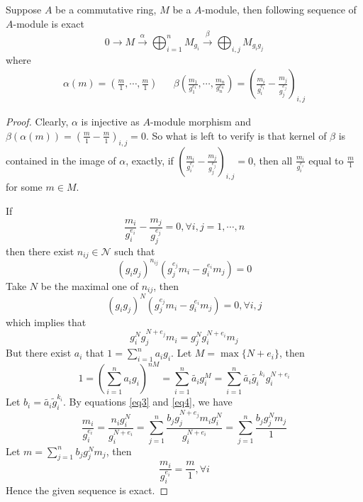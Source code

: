 \begin{lemma}
\label{lem1}
Suppose $A$ be a commutative ring, $M$ be a $A$-module, then following sequence of $A$-module is exact
\[
0 \rightarrow M \xrightarrow{\alpha} \bigoplus_{i=1}^{n} M_{g_i} \xrightarrow{\beta} \bigoplus_{i,j}M_{g_{i}g_{j}}
\]
where
\begin{align*}
\alpha(m)=(\frac{m}{1},\cdots, \frac{m}{1})& & \beta(\frac{m_1}{g_{1}^{e_1}},\cdots, \frac{m_n}{g_{n}^{e_n}})=(\frac{m_i}{g_{i}^{e_i}}-\frac{m_j}{g_{j}^{e_j}})_{i,j}
\end{align*}
\end{lemma}
\begin{proof}
Clearly, $\alpha$ is injective as $A$-module morphism and $\beta(\alpha(m))=(\frac{m}{1}-\frac{m}{1})_{i,j}=0$. So what is left to verify is that kernel of $\beta$ is contained in the image of $\alpha$, exactly, if $(\frac{m_i}{g_{i}^{e_i}}-\frac{m_j}{g_{j}^{e_j}})_{i,j}=0$, then all $\frac{m_i}{g_{i}^{e_i}}$ equal to $\frac{m}{1}$ for some $m \in M$.
\par
If
\[
\frac{m_i}{g_{i}^{e_i}}-\frac{m_j}{g_{j}^{e_j}}=0, \forall i, j =1,\cdots, n
\]
then there exist $n_{ij} \in \mathcal{N}$ such that
\begin{equation}
\label{eq1}
(g_{i}g_{j})^{n_{ij}}(g_{j}^{e_j} m_i - g_{i}^{e_i} m_j) =0
\end{equation}
Take $N$ be the maximal one of $n_{ij}$, then
\begin{equation}
\label{eq2}
(g_{i}g_{j})^{N}(g_{j}^{e_j} m_i - g_{i}^{e_i} m_j) =0, \forall i,j
\end{equation}
which implies that
\begin{equation}
\label{eq3}
g_{i}^{N}g_{j}^{N+e_{j}}m_{i}=g_{j}^{N}g_{i}^{N+e_{i}} m_{j}
\end{equation}
But there exist $a_i$ that $1=\sum_{i=1}^{n} a_{i} g_{i}$. Let $M=\max \{ N + e_{i} \}$, then
\begin{equation}
\label{eq4}
1=(\sum_{i=1}^{n}a_{i}g_{i})^{nM}=\sum_{i=1}^{n} \tilde{a_{i}}g_{i}^{M}=\sum_{i=1}^{n}\tilde{a_{i}}\tilde{g_{i}}^{k_i} g_{i}^{N+e_{i}}
\end{equation}
Let $b_i = \tilde{a_{i}}\tilde{g}_{i}^{k_i}$. By equations \ref{eq3} and \ref{eq4}, we have
\[
\frac{m_i}{g_{i}^{e_i}}=\frac{n_{i}g_{i}^{N}}{g_{i}^{N+e_{i}}}=\sum_{j=1}^{n}\frac{b_{j}g_{j}^{N+e_{j}}m_{i}g_{i}^{N}}{g_{i}^{N+e_{i}}}=\sum_{j=1}^{n} \frac{b_{j}g_{j}^{N}m_{j}}{1}
\]
Let $m=\sum_{j=1}^{n}b_{j}g_{j}^{N}m_{j}$, then
\[
\frac{m_i}{g_{i}^{e_i}}=\frac{m}{1}, \forall i
\]
Hence the given sequence is exact.
\end{proof}
